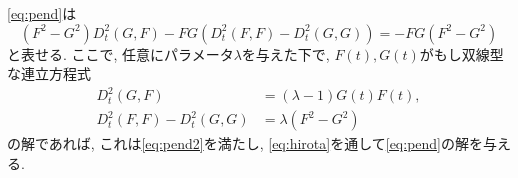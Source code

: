 \documentclass[a4paper]{ujarticle}
\numberwithin{equation}{section}
\theoremstyle{definition}
\begin{document}
    \eqref{eq:pend}は
    \begin{equation} \label{eq:pend2}
        (F^2 - G^2) D^2_t(G, F) - F G (D^2_t(F, F) - D^{2}_{t}(G, G)) = - F G (F^2 - G^2)
    \end{equation}
    と表せる.
    ここで, 任意にパラメータ$\lambda$を与えた下で, 
    $F(t), G(t)$がもし双線型な連立方程式
    \begin{equation} \label{eq:pend3}
        \begin{aligned}
            D^2_t(G, F) &= (\lambda - 1) G(t) F(t), \\
            D^2_t(F, F) - D^{2}_{t}(G, G) &= \lambda (F^2 - G^2)
        \end{aligned}
    \end{equation}
    の解であれば, これは\eqref{eq:pend2}を満たし, \eqref{eq:hirota}を通して\eqref{eq:pend}の解を与える.
\end{document}

